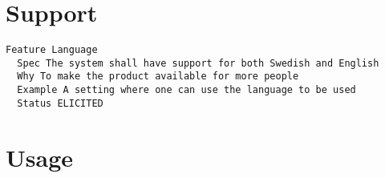         
       \section{Support}


\begin{lstlisting}
Feature Language
  Spec The system shall have support for both Swedish and English
  Why To make the product available for more people
  Example A setting where one can use the language to be used
  Status ELICITED

\end{lstlisting}
    
        
       \section{Usage}



